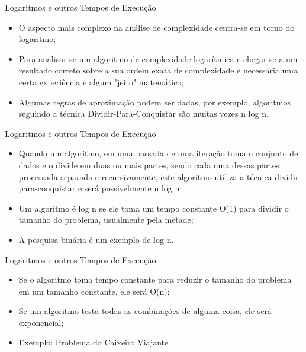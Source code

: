 \documentclass[12pt,table,xcolor={dvipsnames}]{beamer}
\begin{document}
\begin{frame}[fragile]{Logaritmos e outros Tempos de Execução}
\begin{itemize}
\item O aspecto mais complexo na análise de complexidade centra-se em torno do logaritmo; 
\item Para analisar-se um algoritmo de complexidade logarítmica e chegar-se a um resultado correto sobre a sua ordem exata de complexidade é necessária uma certa experiência e algum "jeito" matemático;
\item Algumas regras de aproximação podem ser dadas, por exemplo, algoritmos seguindo a técnica Dividir-Para-Conquistar são muitas vezes n log n.
\end{itemize}
\end{frame}

\begin{frame}[fragile]{Logaritmos e outros Tempos de Execução}
\begin{itemize}
\item Quando um algoritmo, em uma passada de uma iteração toma o conjunto de dados e o divide em duas ou mais partes, sendo cada uma dessas partes processada separada e recursivamente, este algoritmo utiliza a técnica dividir-para-conquistar e será possivelmente n log n;
\item Um algoritmo é log n se ele toma um tempo constante O(1) para dividir o tamanho do problema, usualmente pela metade;
\item A pesquisa binária é um exemplo de log n.
\end{itemize}
\end{frame}

\begin{frame}[fragile]{Logaritmos e outros Tempos de Execução}
\begin{itemize}
\item Se o algoritmo toma tempo constante para reduzir o tamanho do problema em um tamanho constante, ele será O(n);
\item Se um algoritmo testa todas as combinações de alguma coisa, ele será exponencial;
\item Exemplo: Problema do Caixeiro Viajante
\end{itemize}
\end{frame}
\end{document}
